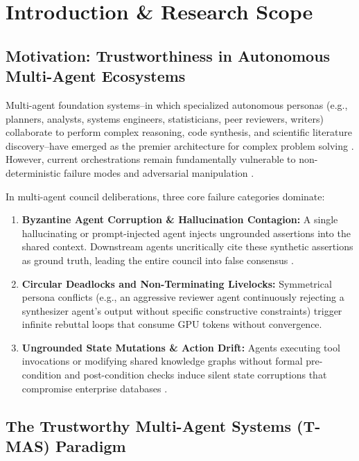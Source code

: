 \documentclass{article}
\begin{document}
\section{Introduction \& Research Scope}



\subsection{Motivation: Trustworthiness in Autonomous Multi-Agent Ecosystems}


Multi-agent foundation systems--in which specialized autonomous personas (e.g., planners, analysts, systems engineers, statisticians, peer reviewers, writers) collaborate to perform complex reasoning, code synthesis, and scientific literature discovery--have emerged as the premier architecture for complex problem solving \cite{arxiv_2005_14165,arxiv_2405_01543}. However, current orchestrations remain fundamentally vulnerable to non-deterministic failure modes and adversarial manipulation \cite{arxiv_2312_03893}.

In multi-agent council deliberations, three core failure categories dominate:
\begin{enumerate}
  \item \textbf{Byzantine Agent Corruption \& Hallucination Contagion:} A single hallucinating or prompt-injected agent injects ungrounded assertions into the shared context. Downstream agents uncritically cite these synthetic assertions as ground truth, leading the entire council into false consensus \cite{arxiv_2406_00584}.
  \item \textbf{Circular Deadlocks and Non-Terminating Livelocks:} Symmetrical persona conflicts (e.g., an aggressive reviewer agent continuously rejecting a synthesizer agent's output without specific constructive constraints) trigger infinite rebuttal loops that consume GPU tokens without convergence.
  \item \textbf{Ungrounded State Mutations \& Action Drift:} Agents executing tool invocations or modifying shared knowledge graphs without formal pre-condition and post-condition checks induce silent state corruptions that compromise enterprise databases \cite{arxiv_2404_04289}.
\end{enumerate}


\subsection{The Trustworthy Multi-Agent Systems (T-MAS) Paradigm}
\end{document}
